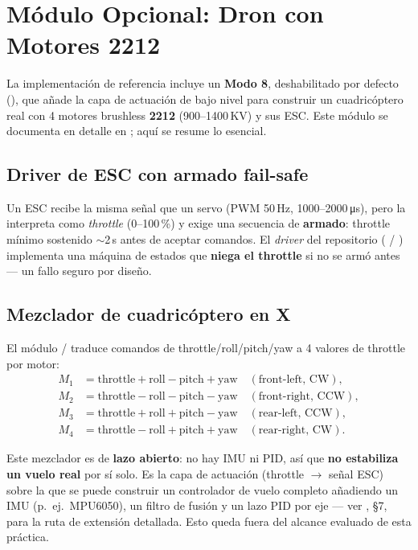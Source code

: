 \documentclass[11pt]{article}
\begin{document}
\section{Módulo Opcional: Dron con Motores 2212}
\label{sec:dron}

La implementación de referencia incluye un \textbf{Modo 8}, deshabilitado por defecto
(), que añade la capa de actuación de bajo nivel para
construir un cuadricóptero real con 4 motores brushless \textbf{2212} (900--1400\,KV) y
sus ESC. Este módulo se documenta en detalle en ; aquí se resume
lo esencial.

\subsection{Driver de ESC con armado fail-safe}
Un ESC recibe la misma señal que un servo (PWM 50\,Hz, 1000--2000\,\si{\micro\second}),
pero la interpreta como \emph{throttle} (0--100\,\%) y exige una secuencia de
\textbf{armado}: throttle mínimo sostenido $\sim$2\,s antes de aceptar comandos. El
\emph{driver} del repositorio ( / ) implementa una
máquina de estados que \textbf{niega el throttle} si no se armó antes — un fallo seguro
por diseño.

\subsection{Mezclador de cuadricóptero en X}
El módulo  /  traduce comandos de
throttle/roll/pitch/yaw a 4 valores de throttle por motor:
\begin{align}
  M_1 &= \text{throttle}+\text{roll}-\text{pitch}+\text{yaw} \quad (\text{front-left, CW}), \\
  M_2 &= \text{throttle}-\text{roll}-\text{pitch}-\text{yaw} \quad (\text{front-right, CCW}), \\
  M_3 &= \text{throttle}+\text{roll}+\text{pitch}-\text{yaw} \quad (\text{rear-left, CCW}), \\
  M_4 &= \text{throttle}-\text{roll}+\text{pitch}+\text{yaw} \quad (\text{rear-right, CW}).
\end{align}

\begin{nota}
Este mezclador es de \textbf{lazo abierto}: no hay IMU ni PID, así que \textbf{no
estabiliza un vuelo real} por sí solo. Es la capa de actuación (throttle $\to$ señal ESC)
sobre la que se puede construir un controlador de vuelo completo añadiendo un IMU
(p.\ ej.\ MPU6050), un filtro de fusión y un lazo PID por eje — ver
, \S7, para la ruta de extensión detallada. Esto queda fuera del
alcance evaluado de esta práctica.
\end{nota}
\end{document}
